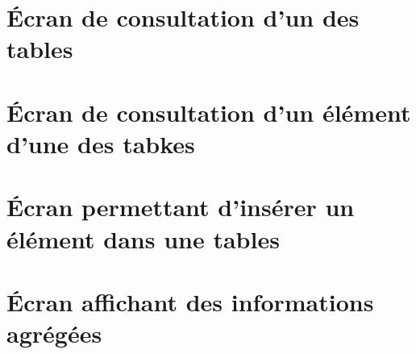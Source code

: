 \section{Écran de consultation d'un des tables}



\section{Écran de consultation d'un élément d'une des tabkes}


\section{Écran permettant d'insérer un élément dans une tables}



\section{Écran affichant des informations agrégées}